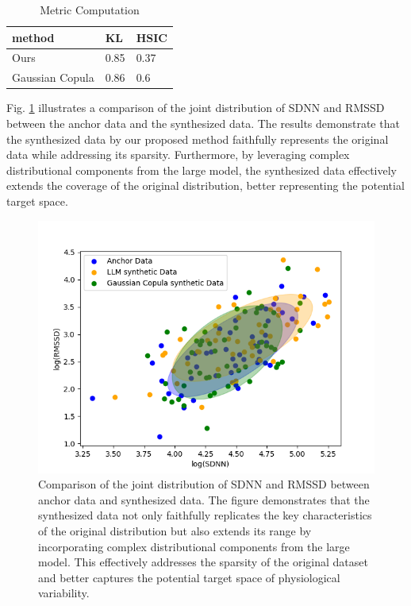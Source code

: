 \documentclass[preprint,12pt]{elsarticle}
\begin{document}
\begin{table}[h]
\centering
\caption{\label{tab:KL}Metric Computation}
\setlength{\tabcolsep}{3pt} %
\renewcommand{\arraystretch}{1.0} %
\begin{tabular}{l p{1.1cm} p{1.1cm} }
\toprule
method & KL & HSIC\\ 
\midrule
Ours & 0.85 & 0.37\\
\midrule
Gaussian Copula \cite{merrill2024transforming} & 0.86 & 0.6 \\
\bottomrule
\end{tabular}
\end{table}

Fig. \ref{fig10} illustrates a comparison of the joint distribution of SDNN and RMSSD between the anchor data and the synthesized data. The results demonstrate that the synthesized data by our proposed method faithfully represents the original data while addressing its sparsity. Furthermore, by leveraging complex distributional components from the large model, the synthesized data effectively extends the coverage of the original distribution, better representing the potential target space.
\begin{figure}[!t]
\centerline{\includegraphics[width=\columnwidth]{synth.png}}
\caption{Comparison of the joint distribution of SDNN and RMSSD between anchor data and synthesized data. The figure demonstrates that the synthesized data not only faithfully replicates the key characteristics of the original distribution but also extends its range by incorporating complex distributional components from the large model. This effectively addresses the sparsity of the original dataset and better captures the potential target space of physiological variability.}
\label{fig10}
\end{figure}
\end{document}
